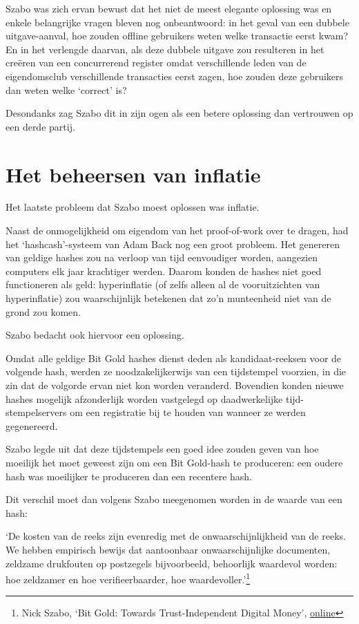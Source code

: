 \documentclass[
  a5paper,
  smalldemyvopaper,11pt,twoside,onecolumn,openright,extrafontsizes]{memoir}
\begin{document}
Szabo was zich ervan bewust dat het niet de meest elegante oplossing was
en enkele belangrijke vragen bleven nog onbeantwoord: in het geval van
een dubbele uitgave-aanval, hoe zouden offline gebruikers weten welke
transactie eerst kwam? En in het verlengde daarvan, als deze dubbele
uitgave zou resulteren in het creëren van een concurrerend register
omdat verschillende leden van de eigendomsclub verschillende transacties
eerst zagen, hoe zouden deze gebruikers dan weten welke `correct' is?

Desondanks zag Szabo dit in zijn ogen als een betere oplossing dan
vertrouwen op een derde partij.

\section{Het beheersen van inflatie}\label{het-beheersen-van-inflatie}

Het laatste probleem dat Szabo moest oplossen was inflatie.

Naast de onmogelijkheid om eigendom van het proof-of-work over te
dragen, had het `hashcash'-systeem van Adam Back nog een groot probleem.
Het genereren van geldige hashes zou na verloop van tijd eenvoudiger
worden, aangezien computers elk jaar krachtiger werden. Daarom konden de
hashes niet goed functioneren als geld: hyperinflatie (of zelfs alleen
al de vooruitzichten van hyperinflatie) zou waarschijnlijk betekenen dat
zo'n munteenheid niet van de grond zou komen.

Szabo bedacht ook hiervoor een oplossing.

Omdat alle geldige Bit Gold hashes dienst deden als kandidaat-reeksen
voor de volgende hash, werden ze noodzakelijkerwijs van een tijdstempel
voorzien, in die zin dat de volgorde ervan niet kon worden veranderd.
Bovendien konden nieuwe hashes mogelijk afzonderlijk worden vastgelegd
op daadwerkelijke tijd-stempelservers om een registratie bij te houden
van wanneer ze werden gegenereerd.

Szabo legde uit dat deze tijdstempels een goed idee zouden geven van hoe
moeilijk het moet geweest zijn om een Bit Gold-hash te produceren: een
oudere hash was moeilijker te produceren dan een recentere hash.

Dit verschil moet dan volgens Szabo meegenomen worden in de waarde van
een hash:

`De kosten van de reeks zijn evenredig met de onwaarschijnlijkheid van
de reeks. We hebben empirisch bewijs dat aantoonbaar onwaarschijnlijke
documenten, zeldzame drukfouten op postzegels bijvoorbeeld, behoorlijk
waardevol worden: hoe zeldzamer en hoe verifieerbaarder, hoe
waardevoller.'\footnote{Nick Szabo, `Bit Gold: Towards Trust-Independent
  Digital Money',
  \href{https://web.archive.org/web/20140406003811/http://szabo.best.vwh.net/bitgold.html}{online}}
\end{document}

